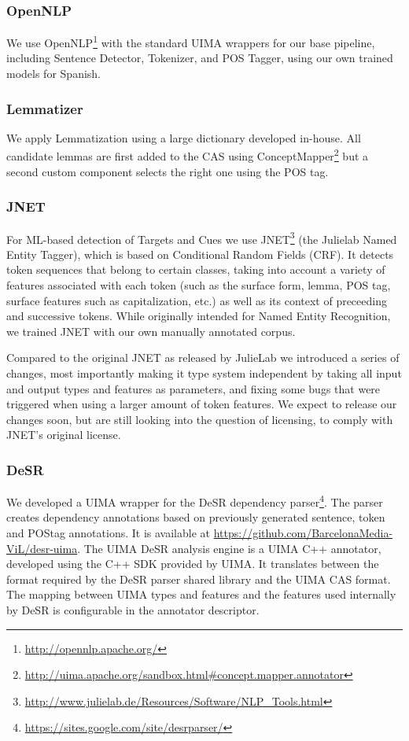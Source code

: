 \documentclass{llncs}
\begin{document}
\subsubsection{OpenNLP}

We use OpenNLP\footnote{\url{http://opennlp.apache.org/}} with the standard UIMA wrappers for our base pipeline, including Sentence Detector, Tokenizer, and POS Tagger, using our own trained models for Spanish.

\subsubsection{Lemmatizer}

We apply Lemmatization using a large dictionary developed in-house. All candidate lemmas are first added to the CAS using ConceptMapper\footnote{\url{http://uima.apache.org/sandbox.html\#concept.mapper.annotator}} but a second custom component selects the right one using the POS tag.

\subsubsection{JNET}

For ML-based detection of Targets and Cues we use JNET\footnote{\url{http://www.julielab.de/Resources/Software/NLP\_Tools.html}} (the Julielab Named Entity Tagger), which is based on Conditional Random Fields (CRF). It detects token sequences that belong to certain classes, taking into account  a variety of features associated with each token (such as the surface form, lemma, POS tag, surface features such as capitalization, etc.) as well as its context of preceeding and successive tokens. While originally intended for Named Entity Recognition, we trained JNET with our own manually annotated corpus.

Compared to the original JNET as released by JulieLab we introduced a series of changes, most importantly making it type system independent by taking all input and output types and features as parameters, and fixing some bugs that were triggered when using a larger amount of token features. We expect to release our changes soon, but are still looking into the question of licensing, to comply with JNET's original license.

\subsubsection{DeSR}

We developed a UIMA wrapper for the DeSR dependency parser\footnote{\url{https://sites.google.com/site/desrparser/}}. The parser creates dependency annotations based on previously generated sentence, token and POStag annotations. It is available at \url{https://github.com/BarcelonaMedia-ViL/desr-uima}. The UIMA DeSR analysis engine is a UIMA C++ annotator, developed using the C++ SDK provided by UIMA. It translates between the format required by the DeSR parser shared library and the UIMA CAS format. The mapping between UIMA types and features and the features used internally by DeSR is configurable in the annotator descriptor.
\end{document}
